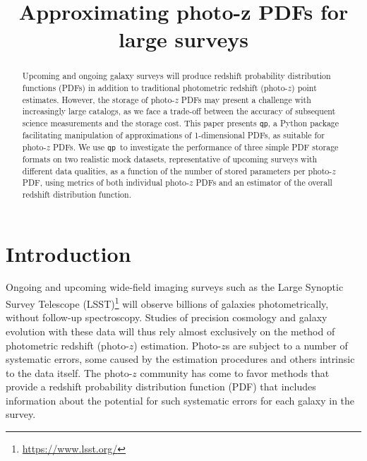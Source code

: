 \documentclass[\docopts]{\docclass}
\newcommand{\qp}{\texttt{qp}}
\newcommand{\pz}{photo-$z$ PDF}
\begin{document}
\title{ Approximating photo-z PDFs for large surveys }


\begin{abstract}

Upcoming and ongoing galaxy surveys will produce redshift probability 
distribution functions (PDFs) in addition to traditional photometric redshift 
(photo-$z$) point estimates.
However, the storage of \pz s may present a challenge with increasingly large 
catalogs, as we face a trade-off between the accuracy of subsequent science 
measurements and the storage cost.
This paper presents \qp, a Python package facilitating manipulation of 
approximations of 1-dimensional PDFs, as suitable for \pz s.
We use \qp\ to investigate the performance of three simple PDF storage formats 
on two realistic mock datasets, representative of upcoming surveys with 
different data qualities, as a function of the number of stored parameters per 
\pz, using metrics of both individual \pz s and an estimator of the overall 
redshift distribution function.

\end{abstract}


\maketitlepost





\section{Introduction}
\label{sec:intro}


Ongoing and upcoming wide-field imaging surveys such as the Large Synoptic 
Survey Telescope 
(LSST)\footnote{\url{https://www.lsst.org/}}\citep{ivezic_lsst:_2008} will 
observe billions of galaxies photometrically, without follow-up spectroscopy.
Studies of precision cosmology and galaxy evolution with these data will thus 
rely almost exclusively on the method of photometric redshift (photo-$z$) 
estimation.
Photo-$z$s are subject to a number of systematic errors, some caused by the 
estimation procedures and others intrinsic to the data itself.
The photo-$z$ community has come to favor methods that provide a redshift 
probability distribution function (PDF) that includes information about the 
potential for such systematic errors for each galaxy in the survey.
\end{document}
